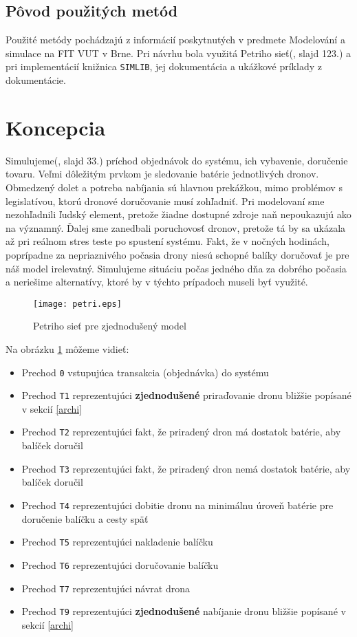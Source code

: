 \documentclass[czech, 12pt, a4paper]{article}
\begin{document}
\subsection{Pôvod použitých metód}
Použité metódy pochádzajú z informácií poskytnutých v predmete Modelování a simulace na FIT VUT v Brne. Pri návrhu bola využitá Petriho sieť(\cite{prednasky}, slajd 123.) a pri implementácií knižnica \texttt{SIMLIB}, jej dokumentácia a ukážkové príklady z dokumentácie. 


\newpage
\section{Koncepcia}
Simulujeme(\cite{prednasky}, slajd 33.) príchod objednávok do systému, ich vybavenie, doručenie tovaru. Veľmi dôležitým prvkom je sledovanie batérie jednotlivých dronov. Obmedzený dolet a potreba nabíjania sú hlavnou prekážkou, mimo problémov s legislatívou, ktorú dronové doručovanie musí zohľadniť. Pri modelovaní sme nezohľadnili ľudský element, pretože žiadne dostupné zdroje naň nepoukazujú ako na významný. Ďalej sme zanedbali poruchovosť dronov, pretože tá by sa ukázala až pri reálnom stres teste po spustení systému. Fakt, že v nočných hodinách, poprípadne za nepriaznivého počasia drony niesú schopné balíky doručovať je pre náš model irelevatný. Simulujeme situáciu počas jedného dňa za dobrého počasia a neriešime alternatívy, ktoré by v týchto prípadoch museli byť využité. 

\begin{figure}[h!]
	\texttt{[image: petri.eps]}
	\caption{Petriho sieť pre zjednodušený model}
	\label{petri}
\end{figure}

Na obrázku \ref{petri} môžeme vidieť:
\begin{itemize}
\item Prechod \texttt{0} vstupujúca transakcia (objednávka) do systému
\item Prechod \texttt{T1} reprezentujúci \textbf{zjednodušené} priraďovanie dronu bližšie popísané v sekcií \ref{archi}
\item Prechod \texttt{T2} reprezentujúci fakt, že priradený dron má dostatok batérie, aby balíček doručil
\item Prechod \texttt{T3} reprezentujúci fakt, že priradený dron nemá dostatok batérie, aby balíček doručil
\item Prechod \texttt{T4} reprezentujúci dobitie dronu na minimálnu úroveň batérie pre doručenie balíčku a cesty späť
\item Prechod \texttt{T5} reprezentujúci nakladenie balíčku
\item Prechod \texttt{T6} reprezentujúci doručovanie balíčku
\item Prechod \texttt{T7} reprezentujúci návrat drona
\item Prechod \texttt{T9} reprezentujúci \textbf{zjednodušené} nabíjanie dronu bližšie popísané v sekcií \ref{archi} 
\end{itemize}
\end{document}
